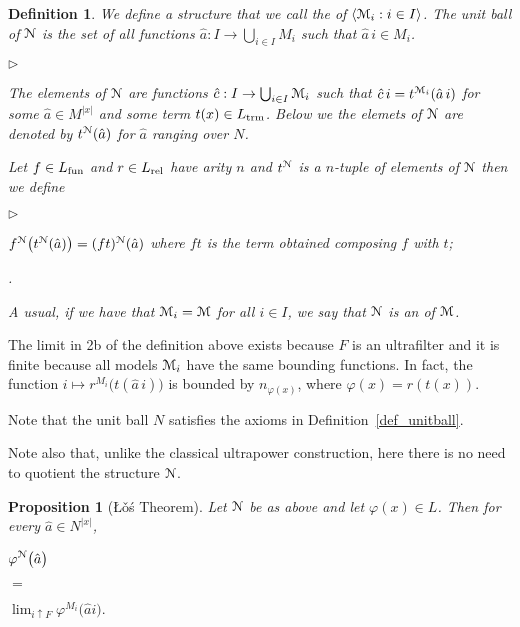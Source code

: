 \documentclass[12pt,letterpaper,oneside,reqno]{amsart}
\newcommand{\mylabel}[1]{{#1}\hfill}
\renewenvironment{itemize}
  {\begin{list}{$\triangleright$}{%
   \setlength{\parskip}{0mm}
   \setlength{\topsep}{.2\baselineskip}
   \setlength{\rightmargin}{0mm}
   \setlength{\listparindent}{0mm}
   \setlength{\itemindent}{0mm}
   \setlength{\labelwidth}{3ex}
   \setlength{\itemsep}{.2\baselineskip}
   \setlength{\parsep}{.2\baselineskip}
   \setlength{\partopsep}{0mm}
   \setlength{\labelsep}{1ex}
   \setlength{\leftmargin}{\labelwidth+\labelsep}
   \let\makelabel\mylabel}}{%
   \end{list}}
\theoremstyle{plain}
\newtheorem{proposition}[theorem]{Proposition}
\newtheorem{definition}[theorem]{Definition}
\theoremstyle{remark}
\renewcommand*{\emph}[1]{%
   \smash{\tikz[baseline]\node[rectangle, fill=olive!25, rounded corners, inner xsep=0.5ex, inner ysep=0.2ex, anchor=base, minimum height = 2.7ex]{#1};}}
\begin{document}
\begin{definition}\label{def_ultraproduct}
  We define a structure \emph{${\EuScript N}$\/} that we call the \emph{ultraproduct\/} of $\langle{\EuScript M}_i:i\in I\rangle$.
  The unit ball of ${\EuScript N}$ is the set \emph{$N$\/} of all functions $\hat a: I\to\bigcup_{i\in I}M_i$ such that $\hat a\,i\in M_i$.
  \begin{itemize}
    \item[1.] The elements of ${\EuScript N}$ are functions $\hat c: I\to \bigcup_{i\in I}{\EuScript M}_i$ such that $\hat c\,i = t^{{\EuScript M}_i}(\hat a\,i)$ for some $\hat a\in M^{|x|}$ and some term $t(x)\in L_{\rm trm}$.
    Below we the elemets of ${\EuScript N}$ are denoted by $t^{\EuScript N}(\hat a)$ for $\hat a$ ranging over $N$.
    \item[2.] Let $f\in L_{\rm fun}$ and $r\in L_{\rm rel}$ have arity $n$ and $t^{\EuScript N}$ is a $n$-tuple of elements of ${\EuScript N}$ then we define
          \begin{itemize}
            \item[a.] $f^{\EuScript N}\big(t^{\EuScript N}(\hat a)\big)=(ft)^{\EuScript N}(\hat a)$ where $ft$ is the term obtained composing $f$ with $t$;
            \item[b.] .
          \end{itemize}
  \end{itemize}
  A usual, if we have that ${\EuScript M}_i={\EuScript M}$ for all $i\in I$, we say that ${\EuScript N}$ is an \emph{ultrapower\/} of ${\EuScript M}$.
\end{definition}

The limit in 2b of the definition above exists because $F$ is an ultrafilter and it is finite because all models ${\EuScript M}_i$ have the same bounding functions.
In fact, the function $i\mapsto r^{M_i}\big(t(\hat a\,i)\big)$ is bounded by $n_{\varphi(x)}$, where $\varphi(x)=r(t(x))$.

Note that the unit ball $N$ satisfies the axioms in Definition~\ref{def_unitball}.

Note also that, unlike the classical ultrapower construction, here there is no need to quotient the structure ${\EuScript N}$.

\def\ceq#1#2#3{\parbox[t]{43ex}{$\displaystyle #1$}\parbox{5ex}{\hfil $#2$}{$\displaystyle #3$}}

\begin{proposition}[\L\v{o}\'s Theorem]
  Let ${\EuScript N}$ be as above and let $\varphi(x)\in L$. Then for every $\hat a\in N^{|x|}$,

  \ceq{\hfill \varphi^{\EuScript N}\big(\hat a\big)}{=}{\lim_{i\uparrow F}\varphi^{M_i}\big(\hat ai\big).}

\end{proposition}
\end{document}
